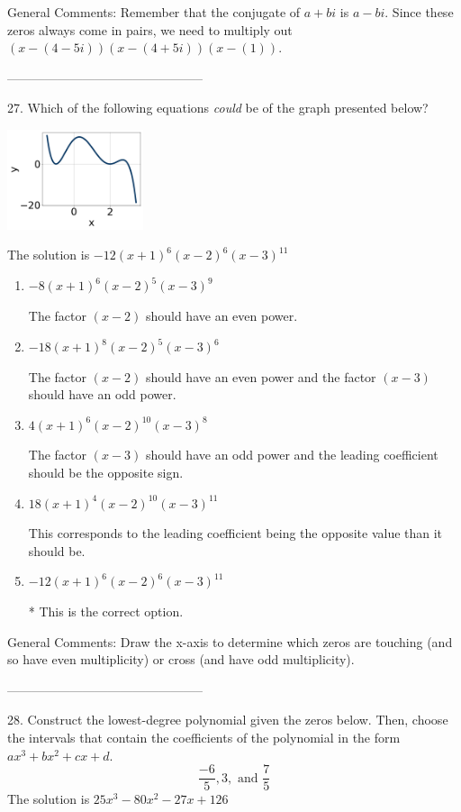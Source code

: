 \documentclass{extbook}[14pt]
\begin{document}
General Comments: Remember that the conjugate of $a+bi$ is $a-bi$. Since these zeros always come in pairs, we need to multiply out $(x-(4 - 5i))(x-(4 + 5i))(x-(1))$.

-----------------------------------------------

27. Which of the following equations \textit{could} be of the graph presented below?
\begin{center} \includegraphics[width=0.3\textwidth]{../Figures/polyGraphToFunctionC.png} \end{center} 

The solution is $ -12(x + 1)^{6} (x - 2)^{6} (x - 3)^{11} $ 

\begin{enumerate}[label=\Alph*.] 
\item $ -8(x + 1)^{6} (x - 2)^{5} (x - 3)^{9} $ 

 The factor $(x - 2)$ should have an even power. 
\item $ -18(x + 1)^{8} (x - 2)^{5} (x - 3)^{6} $ 

 The factor $(x - 2)$ should have an even power and the factor $(x - 3)$ should have an odd power. 
\item $ 4(x + 1)^{6} (x - 2)^{10} (x - 3)^{8} $ 

 The factor $(x - 3)$ should have an odd power and the leading coefficient should be the opposite sign. 
\item $ 18(x + 1)^{4} (x - 2)^{10} (x - 3)^{11} $ 

 This corresponds to the leading coefficient being the opposite value than it should be. 
\item $ -12(x + 1)^{6} (x - 2)^{6} (x - 3)^{11} $ 

 * This is the correct option. 
\end{enumerate} 
 
General Comments: Draw the x-axis to determine which zeros are touching (and so have even multiplicity) or cross (and have odd multiplicity).

-----------------------------------------------

28. Construct the lowest-degree polynomial given the zeros below. Then, choose the intervals that contain the coefficients of the polynomial in the form $ax^3+bx^2+cx+d$.
\[ \frac{-6}{5}, 3, \text{ and } \frac{7}{5} \] 
The solution is $ 25x^{3} -80 x^{2} -27 x + 126 $ 
\end{document}
